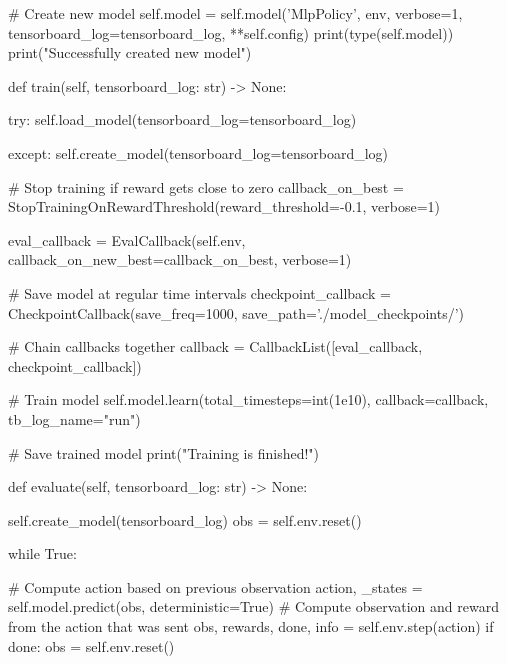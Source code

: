 \begin{pyverbatim}
        # Create new model
        self.model = self.model('MlpPolicy', 
                                 env, verbose=1,
                                 tensorboard_log=tensorboard_log,
                                 **self.config)
        print(type(self.model))
        print("Successfully created new model")

    def train(self, tensorboard_log: str) -> None:

        try:
            self.load_model(tensorboard_log=tensorboard_log)

        except:
            self.create_model(tensorboard_log=tensorboard_log)

        # Stop training if reward gets close to zero
        callback_on_best = StopTrainingOnRewardThreshold(reward_threshold=-0.1, 
                                                         verbose=1)
                                                                                           
        eval_callback = EvalCallback(self.env, 
                                     callback_on_new_best=callback_on_best, 
                                     verbose=1)

        # Save model at regular time intervals
        checkpoint_callback = CheckpointCallback(save_freq=1000, 
                                                 save_path='./model_checkpoints/')

        # Chain callbacks together
        callback = CallbackList([eval_callback, checkpoint_callback])

        # Train model
        self.model.learn(total_timesteps=int(1e10), 
                           callback=callback, 
                           tb_log_name="run")

        # Save trained model
        print("Training is finished!")

    def evaluate(self, tensorboard_log: str) -> None:

        self.create_model(tensorboard_log)
        obs = self.env.reset()

        while True:

            # Compute action based on previous observation
            action, _states = self.model.predict(obs, deterministic=True)
            # Compute observation and reward from the action that was sent
            obs, rewards, done, info = self.env.step(action)
            if done:
                obs = self.env.reset()
                
\end{pyverbatim}


